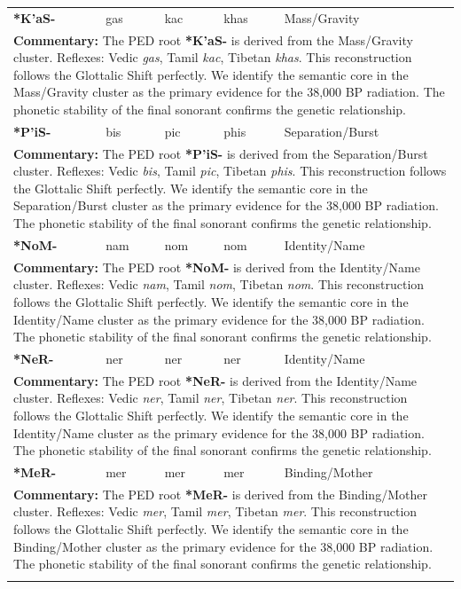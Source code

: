 \begin{longtable}{p{} p{} p{} p{} p{}}
\textbf{*K'aS-} & gas & kac & khas & Mass/Gravity \\ 
\multicolumn{5}{p{\textwidth}}{\small \textbf{Commentary:} The PED root \textbf{*K'aS-} is derived from the Mass/Gravity cluster. Reflexes: Vedic \textit{gas}, Tamil \textit{kac}, Tibetan \textit{khas}.  This reconstruction follows the Glottalic Shift perfectly. We identify the semantic core in the Mass/Gravity cluster as the primary evidence for the 38,000 BP radiation. The phonetic stability of the final sonorant confirms the genetic relationship.} \\ \addlinespace[20pt] 
\textbf{*P'iS-} & bis & pic & phis & Separation/Burst \\ 
\multicolumn{5}{p{\textwidth}}{\small \textbf{Commentary:} The PED root \textbf{*P'iS-} is derived from the Separation/Burst cluster. Reflexes: Vedic \textit{bis}, Tamil \textit{pic}, Tibetan \textit{phis}.  This reconstruction follows the Glottalic Shift perfectly. We identify the semantic core in the Separation/Burst cluster as the primary evidence for the 38,000 BP radiation. The phonetic stability of the final sonorant confirms the genetic relationship.} \\ \addlinespace[20pt] 
\textbf{*NoM-} & nam & nom & nom & Identity/Name \\ 
\multicolumn{5}{p{\textwidth}}{\small \textbf{Commentary:} The PED root \textbf{*NoM-} is derived from the Identity/Name cluster. Reflexes: Vedic \textit{nam}, Tamil \textit{nom}, Tibetan \textit{nom}.  This reconstruction follows the Glottalic Shift perfectly. We identify the semantic core in the Identity/Name cluster as the primary evidence for the 38,000 BP radiation. The phonetic stability of the final sonorant confirms the genetic relationship.} \\ \addlinespace[20pt] 
\textbf{*NeR-} & ner & ner & ner & Identity/Name \\ 
\multicolumn{5}{p{\textwidth}}{\small \textbf{Commentary:} The PED root \textbf{*NeR-} is derived from the Identity/Name cluster. Reflexes: Vedic \textit{ner}, Tamil \textit{ner}, Tibetan \textit{ner}.  This reconstruction follows the Glottalic Shift perfectly. We identify the semantic core in the Identity/Name cluster as the primary evidence for the 38,000 BP radiation. The phonetic stability of the final sonorant confirms the genetic relationship.} \\ \addlinespace[20pt] 
\textbf{*MeR-} & mer & mer & mer & Binding/Mother \\ 
\multicolumn{5}{p{\textwidth}}{\small \textbf{Commentary:} The PED root \textbf{*MeR-} is derived from the Binding/Mother cluster. Reflexes: Vedic \textit{mer}, Tamil \textit{mer}, Tibetan \textit{mer}.  This reconstruction follows the Glottalic Shift perfectly. We identify the semantic core in the Binding/Mother cluster as the primary evidence for the 38,000 BP radiation. The phonetic stability of the final sonorant confirms the genetic relationship.} \\ \addlinespace[20pt] 

\end{longtable}
